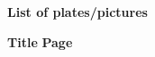 \begin{titlepage}
\label{front:plates}

    \begin{center}
        {\fontsize{14}{18}\selectfont \textbf{List of plates/pictures}}
    \end{center}

    \vspace*{48pt} 

    \noindent
    {\fontsize{12}{14}\selectfont \textbf{Title}} \hfill {\fontsize{12}{14}\selectfont \textbf{Page}} \\[12pt] %

    {\fontsize{12}{18}\selectfont
    \makeatletter
    \newcommand{\cftplatelineleader}{\hfill}
    \renewcommand{\@pnumwidth}{1.55em}
    \renewcommand{\@tocrmarg}{2.55em}
    
    \makeatother
    }

\end{titlepage}

